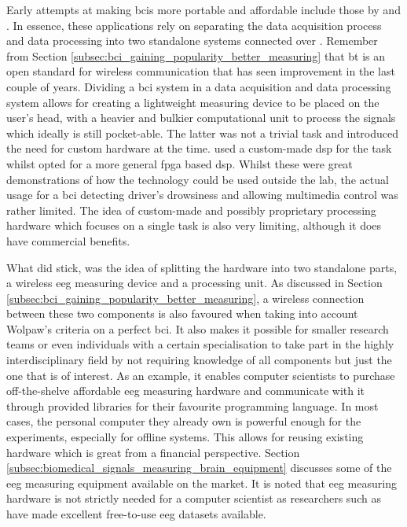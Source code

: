 Early attempts at making \glspl{bci} more portable and affordable include those by \citet{early_bci_drowsiness} and \citet{early_bci_multimedia}.
In essence, these applications rely on separating the data acquisition process and data processing into two standalone systems connected over .
Remember from Section \ref{subsec:bci_gaining_popularity_better_measuring} that \gls{bt} is an open standard for wireless communication that has seen improvement in the last couple of years.
Dividing a \gls{bci} system in a data acquisition and data processing system allows for creating a lightweight measuring device to be placed on the user's head, with a heavier and bulkier computational unit to process the signals which ideally is still pocket-able.
The latter was not a trivial task and introduced the need for custom hardware at the time.
\citet{early_bci_drowsiness} used a custom-made \gls{dsp} for the task whilst \citet{early_bci_multimedia} opted for a more general \gls{fpga} based \gls{dsp}.
Whilst these were great demonstrations of how the technology could be used outside the lab, the actual usage for a bci detecting driver's drowsiness \citep[as proposed in the paper by][]{early_bci_drowsiness} and allowing multimedia control \citep[as proposed in the paper by][]{early_bci_multimedia} was rather limited.
The idea of custom-made and possibly proprietary processing hardware which focuses on a single task is also very limiting, although it does have commercial benefits.

What did stick, was the idea of splitting the hardware into two standalone parts, a wireless \gls{eeg} measuring device and a processing unit.
As discussed in Section \ref{subsec:bci_gaining_popularity_better_measuring}, a wireless connection between these two components is also favoured when taking into account Wolpaw's criteria on a perfect \gls{bci}.
It also makes it possible for smaller research teams or even individuals with a certain specialisation to take part in the highly interdisciplinary field by not requiring knowledge of all components but just the one that is of interest.
As an example, it enables computer scientists to purchase off-the-shelve affordable \gls{eeg} measuring hardware and communicate with it through provided libraries for their favourite programming language.
In most cases, the personal computer they already own is powerful enough for the experiments, especially for offline systems.
This allows for reusing existing hardware which is great from a financial perspective.
Section \ref{subsec:biomedical_signals_measuring_brain_equipment} discusses some of the \gls{eeg} measuring equipment available on the market.
It is noted that \gls{eeg} measuring hardware is not strictly needed for a computer scientist as researchers such as \citet{eeg_data} have made excellent free-to-use \gls{eeg} datasets available.

